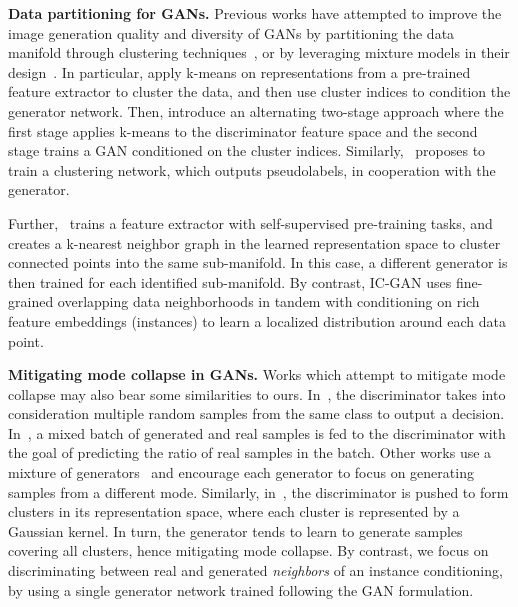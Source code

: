 \textbf{Data partitioning for GANs.} Previous works have attempted to improve the image generation quality and diversity of GANs by partitioning the data manifold through clustering techniques~\cite{armandpour2021partition, grinblat2017class, liu2020diverse, pmlr-v97-lucic19a, noroozi2020self, sage2018logo}, or by leveraging mixture models in their design~\cite{eghbal2019mixture,Ghosh_2018_CVPR,hoang2018mgan}. In particular, \cite{pmlr-v97-lucic19a,sage2018logo} apply k-means on representations from a pre-trained feature extractor to cluster the data,  and then use cluster indices to condition the generator network. Then, \cite{grinblat2017class,liu2020diverse} introduce an alternating two-stage approach where the first stage applies k-means to the discriminator feature space and the second stage trains a GAN conditioned on the cluster indices. Similarly,~\cite{noroozi2020self} proposes to train a clustering network, which outputs pseudolabels, in cooperation with the generator. 

Further,~\cite{armandpour2021partition} trains a feature extractor with self-supervised pre-training tasks, and creates a k-nearest neighbor graph in the learned representation space to cluster connected points into the same sub-manifold. In this case, a different generator is then trained for each identified sub-manifold. By contrast, {IC-GAN} uses fine-grained overlapping data neighborhoods in tandem with conditioning on rich feature embeddings (instances) to learn a localized distribution around each data point.

\textbf{Mitigating mode collapse in GANs.} Works which attempt to mitigate mode collapse may also bear some similarities to ours. In~\cite{lin2018pacgan}, the discriminator takes into consideration multiple random samples from the same class to output a decision. In~\cite{lucas18icml}, a mixed batch of generated and real samples is fed to the discriminator with the goal of predicting the ratio of real samples in the batch. Other works use a mixture of generators~\cite{Ghosh_2018_CVPR,hoang2018mgan} and encourage each generator to focus on generating samples from a different mode. Similarly, in~\cite{eghbal2019mixture}, the discriminator is pushed to form clusters in its representation space, where each cluster is represented by a Gaussian kernel. In turn, the generator tends to learn to generate samples covering all clusters, hence mitigating mode collapse. By contrast, we focus on discriminating between real and generated \emph{neighbors} of an instance conditioning, by using a single generator network trained following the GAN formulation.

